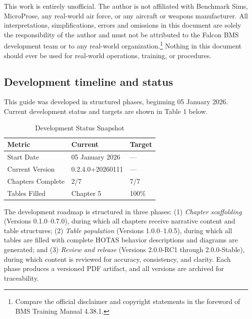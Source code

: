 \documentclass[11pt,a4paper]{article}
\providecommand{\trnman}{BMS Training Manual 4.38.1}
\newcommand{\docversion}{0.2.4.0} %
\newcommand{\docbuild}{20260111}
\newcommand{\docstartdate}{05 January 2026}
\newcommand{\chapterscompletedof}{2/7}
\newcommand{\tablesfilledpct}{Chapter 5}
\newcommand{\fulldocversion}{\docversion+\docbuild}
\begin{document}
This work is entirely unofficial. The author is not affiliated with Benchmark Sims, MicroProse, any real-world air force, or any aircraft or weapons manufacturer. All interpretations, simplifications, errors and omissions in this document are solely the responsibility of the author and must not be attributed to the Falcon BMS development team or to any real-world organization.\footnote{Compare the official disclaimer and copyright statements in the foreword of \trnman{}.} Nothing in this document should ever be used for real-world operations, training, or procedures.

\subsection{Development timeline and status}

This guide was developed in structured phases, beginning \docstartdate{}. Current development status and targets are shown in Table 1 below.

\begin{table}[h]
\centering
\caption{Development Status Snapshot}
\begin{tabular}{L{3.2cm} L{2.5cm} L{2.5cm}}
\toprule
\textbf{Metric} & \textbf{Current} & \textbf{Target} \\
\midrule
Start Date & \docstartdate & --- \\
Current Version & \fulldocversion & --- \\
Chapters Complete & \chapterscompletedof & 7/7 \\
Tables Filled & \tablesfilledpct & 100\% \\
\bottomrule
\end{tabular}
\end{table}

The development roadmap is structured in three phases: (1) \emph{Chapter scaffolding} (Versions 0.1.0--0.7.0), during which all chapters receive narrative content and table structures; (2) \emph{Table population} (Versions 1.0.0--1.0.5), during which all tables are filled with complete HOTAS behavior descriptions and diagrams are generated; and (3) \emph{Review and release} (Versions 2.0.0-RC1 through 2.0.0-Stable), during which content is reviewed for accuracy, consistency, and clarity. Each phase produces a versioned PDF artifact, and all versions are archived for traceability.
\end{document}
